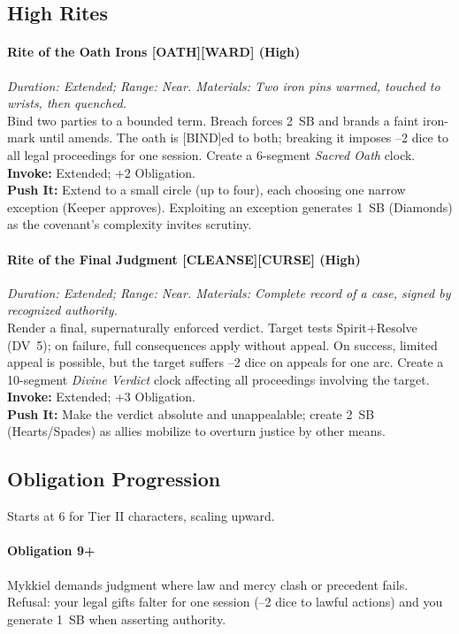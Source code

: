 \subsection*{High Rites}

\paragraph{Rite of the Oath Irons [OATH][WARD] (High)}%
\emph{Duration: Extended; Range: Near. Materials: Two iron pins warmed, touched to wrists, then quenched.}\\
Bind two parties to a bounded term. Breach forces 2~SB and brands a faint iron-mark until amends. The oath is [BIND]ed to both; breaking it imposes --2 dice to all legal proceedings for one session. Create a 6-segment \emph{Sacred Oath} clock.\\
\textbf{Invoke:} Extended; +2 Obligation.\\
\textbf{Push It:} Extend to a small circle (up to four), each choosing one narrow exception (Keeper approves). Exploiting an exception generates 1~SB (Diamonds) as the covenant’s complexity invites scrutiny.

\paragraph{Rite of the Final Judgment [CLEANSE][CURSE] (High)}%
\emph{Duration: Extended; Range: Near. Materials: Complete record of a case, signed by recognized authority.}\\
Render a final, supernaturally enforced verdict. Target tests Spirit+Resolve (DV~5); on failure, full consequences apply without appeal. On success, limited appeal is possible, but the target suffers --2 dice on appeals for one arc. Create a 10-segment \emph{Divine Verdict} clock affecting all proceedings involving the target.\\
\textbf{Invoke:} Extended; +3 Obligation.\\
\textbf{Push It:} Make the verdict absolute and unappealable; create 2~SB (Hearts/Spades) as allies mobilize to overturn justice by other means.

\subsection*{Obligation Progression}
Starts at 6 for Tier II characters, scaling upward.

\paragraph{Obligation 9+} Mykkiel demands judgment where law and mercy clash or precedent fails. Refusal: your legal gifts falter for one session (--2 dice to lawful actions) and you generate 1~SB when asserting authority.

